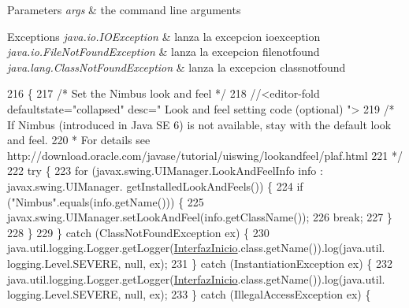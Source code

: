 \begin{DoxyParams}{Parameters}
{\em args} & the command line arguments \\
\hline
\end{DoxyParams}

\begin{DoxyExceptions}{Exceptions}
{\em java.\+io.\+I\+O\+Exception} & lanza la excepcion ioexception \\
\hline
{\em java.\+io.\+File\+Not\+Found\+Exception} & lanza la excepcion filenotfound \\
\hline
{\em java.\+lang.\+Class\+Not\+Found\+Exception} & lanza la excepcion classnotfound \\
\hline
\end{DoxyExceptions}

\begin{DoxyCode}
216                                                                                                            
        \{
217         \textcolor{comment}{/* Set the Nimbus look and feel */}
218         \textcolor{comment}{//<editor-fold defaultstate="collapsed" desc=" Look and feel setting code (optional) ">}
219         \textcolor{comment}{/* If Nimbus (introduced in Java SE 6) is not available, stay with the default look and feel.}
220 \textcolor{comment}{         * For details see http://download.oracle.com/javase/tutorial/uiswing/lookandfeel/plaf.html }
221 \textcolor{comment}{         */}
222         \textcolor{keywordflow}{try} \{
223             \textcolor{keywordflow}{for} (javax.swing.UIManager.LookAndFeelInfo info : javax.swing.UIManager.
      getInstalledLookAndFeels()) \{
224                 \textcolor{keywordflow}{if} (\textcolor{stringliteral}{"Nimbus"}.equals(info.getName())) \{
225                     javax.swing.UIManager.setLookAndFeel(info.getClassName());
226                     \textcolor{keywordflow}{break};
227                 \}
228             \}
229         \} \textcolor{keywordflow}{catch} (ClassNotFoundException ex) \{
230             java.util.logging.Logger.getLogger(\mbox{\hyperlink{class_interfaz_package_1_1_interfaz_inicio_ab0f2775716e858910156769284c39718}{InterfazInicio}}.class.getName()).log(java.util.
      logging.Level.SEVERE, null, ex);
231         \} \textcolor{keywordflow}{catch} (InstantiationException ex) \{
232             java.util.logging.Logger.getLogger(\mbox{\hyperlink{class_interfaz_package_1_1_interfaz_inicio_ab0f2775716e858910156769284c39718}{InterfazInicio}}.class.getName()).log(java.util.
      logging.Level.SEVERE, null, ex);
233         \} \textcolor{keywordflow}{catch} (IllegalAccessException ex) \{

\end{DoxyCode}
